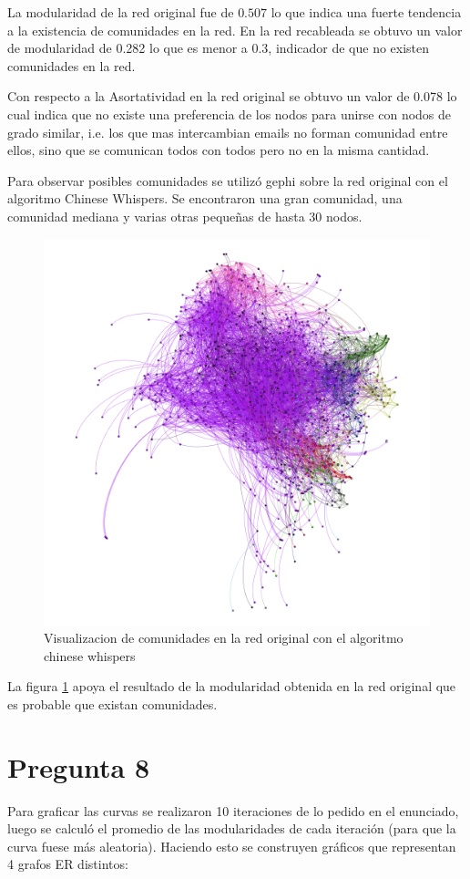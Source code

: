 \documentclass[letterpaper]{article}
\begin{document}
La modularidad de la red original fue de $0.507$ lo que indica una fuerte tendencia a la existencia de comunidades en la red. En la red recableada se obtuvo un valor de modularidad de 0.282 lo que es menor a 0.3, indicador de que no existen comunidades en la red.

Con respecto a la Asortatividad en la red original se obtuvo un valor de 0.078 lo cual indica que no existe una preferencia de los nodos para unirse con nodos de grado similar, i.e. los que mas intercambian emails no forman comunidad entre ellos, sino que se comunican todos con todos pero no en la misma cantidad.

Para observar posibles comunidades se utilizó gephi sobre la red original con el algoritmo Chinese Whispers. Se encontraron una gran comunidad, una comunidad mediana y varias otras pequeñas de hasta 30 nodos.

\begin{figure}[H]
  \centering
  \includegraphics[width=0.66\linewidth]{img/p7.png}
  \caption{Visualizacion de comunidades en la red original con el algoritmo chinese whispers}
  \label{fig:6}
\end{figure}

La figura \ref{fig:6} apoya el resultado de la modularidad obtenida en la red original que es probable que existan comunidades.


\section{Pregunta 8}
Para graficar las curvas se realizaron 10 iteraciones de lo pedido en el enunciado, luego se calculó el promedio de las modularidades de cada iteración (para que la curva fuese más aleatoria). Haciendo esto se construyen gráficos que representan 4 grafos ER distintos:
\end{document}
